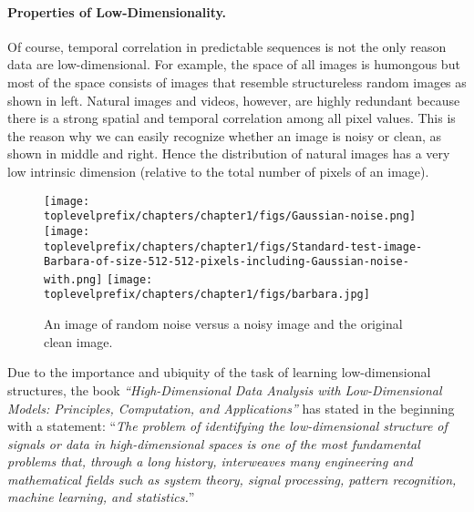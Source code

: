 \documentclass[../../book-main.tex]{subfiles}
\begin{document}
\paragraph{Properties of Low-Dimensionality.}
Of course, temporal correlation in predictable sequences is not the only reason data are low-dimensional. For example, the space of all images is humongous but most of the space consists of images that resemble structureless random images as shown in  left. Natural images and videos, however, are highly redundant because there is a strong spatial and temporal correlation among all pixel values. This is the reason why we can easily recognize whether an image is noisy or clean, as shown in  middle and right. Hence the distribution of natural images has a very low intrinsic dimension (relative to the total number of pixels of an image).

\begin{figure}
    \centering
    \texttt{[image: \\toplevelprefix/chapters/chapter1/figs/Gaussian-noise.png]}\hspace{2mm} 
    \texttt{[image: \\toplevelprefix/chapters/chapter1/figs/Standard-test-image-Barbara-of-size-512-512-pixels-including-Gaussian-noise-with.png]} \hspace{2mm} 
    \texttt{[image: \\toplevelprefix/chapters/chapter1/figs/barbara.jpg]}
    \caption{An image of random noise versus a noisy image and the original clean image. %
    }
    \label{fig:noise-image}
\end{figure}

Due to the importance and ubiquity of the task of  learning low-dimensional structures, the book {\em ``High-Dimensional Data Analysis with Low-Dimensional Models: Principles, Computation, and Applications''} \cite{Wright-Ma-2022} has stated in the beginning with a statement: ``{\em The problem of identifying the low-dimensional structure of signals or data in high-dimensional
spaces is one of the most fundamental problems that, through a long
history, interweaves many engineering and mathematical fields such as system
theory, signal processing, pattern recognition, machine learning, and statistics.}''
\end{document}
